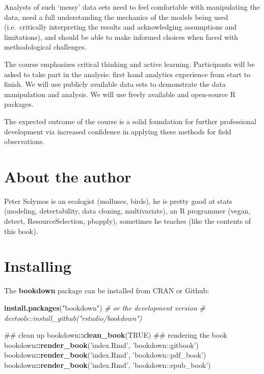 \documentclass[12pt,]{book}
\newenvironment{Shaded}{\begin{snugshade}}{\end{snugshade}}
\newcommand{\CommentTok}[1]{\textcolor[rgb]{0.56,0.35,0.01}{\textit{#1}}}
\newcommand{\KeywordTok}[1]{\textcolor[rgb]{0.13,0.29,0.53}{\textbf{#1}}}
\newcommand{\NormalTok}[1]{#1}
\newcommand{\OperatorTok}[1]{\textcolor[rgb]{0.81,0.36,0.00}{\textbf{#1}}}
\newcommand{\OtherTok}[1]{\textcolor[rgb]{0.56,0.35,0.01}{#1}}
\newcommand{\StringTok}[1]{\textcolor[rgb]{0.31,0.60,0.02}{#1}}
\begin{document}
Analysts of such `messy' data sets need to feel comfortable
with manipulating the data, need a full understanding the mechanics of the
models being used (i.e.~critically interpreting the results and acknowledging
assumptions and limitations), and should be able to make informed choices when
faced with methodological challenges.

The course emphasizes critical thinking and active learning.
Participants will be asked to take part in the analysis:
first hand analytics experience from start to finish.
We will use publicly available data sets to demonstrate the data manipulation
and analysis. We will use freely available and open-source R packages.

The expected outcome of the course is a solid foundation for further
professional development via increased confidence in applying these methods
for field observations.

\hypertarget{about-the-author}{%
\section*{About the author}\label{about-the-author}}

Peter Solymos is an ecologist (molluscs, birds), he is pretty good at stats (modeling, detectability, data cloning, multivariate), an R programmer (vegan, detect, ResourceSelection, pbapply),
sometimes he teaches (like the contents of this book).

\hypertarget{installing}{%
\section*{Installing}\label{installing}}

The \textbf{bookdown} package can be installed from CRAN or Github:

\begin{Shaded}
\begin{Highlighting}[]
\KeywordTok{install.packages}\NormalTok{(}\StringTok{"bookdown"}\NormalTok{)}
\CommentTok{# or the development version}
\CommentTok{# devtools::install_github("rstudio/bookdown")}

\NormalTok{## clean up }
\NormalTok{bookdown}\OperatorTok{::}\KeywordTok{clean_book}\NormalTok{(}\OtherTok{TRUE}\NormalTok{)}
\NormalTok{## rendering the book}
\NormalTok{bookdown}\OperatorTok{::}\KeywordTok{render_book}\NormalTok{(}\StringTok{'index.Rmd'}\NormalTok{, }\StringTok{'bookdown::gitbook'}\NormalTok{)}
\NormalTok{bookdown}\OperatorTok{::}\KeywordTok{render_book}\NormalTok{(}\StringTok{'index.Rmd'}\NormalTok{, }\StringTok{'bookdown::pdf_book'}\NormalTok{)}
\NormalTok{bookdown}\OperatorTok{::}\KeywordTok{render_book}\NormalTok{(}\StringTok{'index.Rmd'}\NormalTok{, }\StringTok{'bookdown::epub_book'}\NormalTok{)}
\end{Highlighting}
\end{Shaded}
\end{document}
